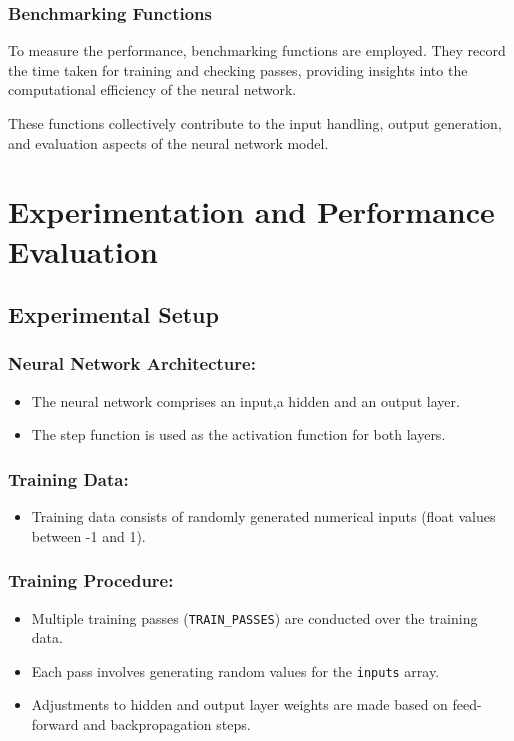 \documentclass{article}
\begin{document}
\subsubsection*{Benchmarking Functions}
To measure the performance, benchmarking functions are employed. They record the time taken for training and checking passes, providing insights into the computational efficiency of the neural network.

These functions collectively contribute to the input handling, output generation, and evaluation aspects of the neural network model.

\clearpage
\section{Experimentation and Performance Evaluation}

\subsection{Experimental Setup}
\subsubsection*{Neural Network Architecture:}
\begin{itemize}
  \item The neural network comprises an input,a hidden and an output layer.
  \item The step function is used as the activation function for both layers.
\end{itemize}
\subsubsection*{Training Data:}
\begin{itemize}
  \item Training data consists of randomly generated numerical inputs (float values between -1 and 1).
\end{itemize}
\subsubsection*{Training Procedure:}
\begin{itemize}
  \item Multiple training passes (\texttt{TRAIN\_PASSES}) are conducted over the training data.
  \item Each pass involves generating random values for the \texttt{inputs} array.
  \item Adjustments to hidden and output layer weights are made based on feed-forward and backpropagation steps.
\end{itemize}
\end{document}
